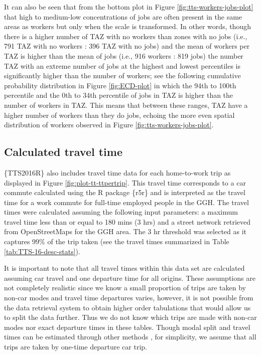 \documentclass[Royal,times,sageh]{sagej}
\begin{document}
It can also be seen that from the bottom plot in Figure
\ref{fig:tts-workers-jobs-plot} that high to medium-low concentrations
of jobs are often present in the same areas as workers but only when the
scale is transformed. In other words, though there is a higher number of
TAZ with no workers than zones with no jobs (i.e., 791 TAZ with no
workers : 396 TAZ with no jobs) and the mean of workers per TAZ is
higher than the mean of jobs (i.e., 916 workers : 819 jobs) the number
TAZ with an extreme number of jobs at the highest and lowest percentiles
is significantly higher than the number of workers; see the following
cumulative probability distribution in Figure \ref{fig:ECD-plot} in
which the 94th to 100th percentile and the 0th to 34th percentile of
jobs in TAZ is higher than the number of workers in TAZ. This means that
between these ranges, TAZ have a higher number of workers than they do
jobs, echoing the more even spatial distribution of workers observed in
Figure \ref{fig:tts-workers-jobs-plot}.

\newpage

\hypertarget{calculated-travel-time}{%
\subsection{Calculated travel time}\label{calculated-travel-time}}

\{TTS2016R\} also includes travel time data for each home-to-work trip
as displayed in Figure \ref{fig:plot-tt-ttpertrip}. This travel time
corresponds to a car commute calculated using the R package \{r5r\} and
is interpreted as the travel time for a work commute for full-time
employed people in the GGH. The travel times were calculated assuming
the following input parameters: a maximum travel time less than or equal
to 180 mins (3 hrs) and a street network retrieved from OpenStreetMaps
for the GGH area. The 3 hr threshold was selected as it captures 99\% of
the trip taken (see the travel times summarized in Table
\ref{tab:TTS-16-desc-stats}).

It is important to note that all travel times within this data set are
calculated assuming car travel and one departure time for all origins.
These assumptions are not completely realistic since we know a small
proportion of trips are taken by non-car modes and travel time
departures varies, however, it is not possible from the data retrieval
system to obtain higher order tabulations that would allow us to split
the data further. Thus we do not know which trips are made with non-car
modes nor exact departure times in these tables. Though modal split and
travel times can be estimated through other methods
\citep[e.g.,][]{allen_suburbanization_2021, higgins2021changes}, for
simplicity, we assume that all trips are taken by one-time departure car
trip.
\end{document}
